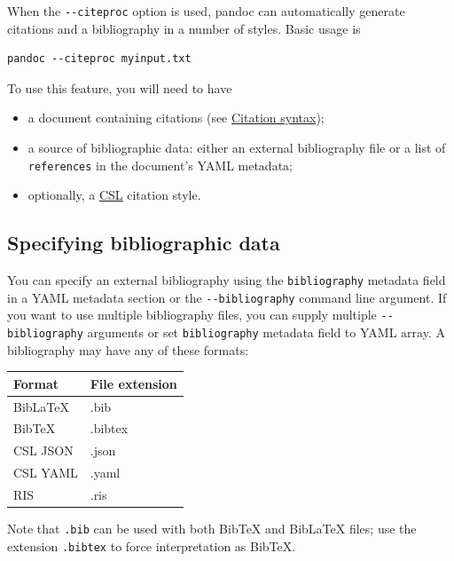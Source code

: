 \documentclass[
]{article}
\providecommand{\tightlist}{%
  \setlength{\itemsep}{0pt}\setlength{\parskip}{0pt}}
\begin{document}
When the \texttt{-\/-citeproc} option is used, pandoc can automatically
generate citations and a bibliography in a number of styles. Basic usage
is

\begin{verbatim}
pandoc --citeproc myinput.txt
\end{verbatim}

To use this feature, you will need to have

\begin{itemize}
\tightlist
\item
  a document containing citations (see
  \protect\hyperlink{citation-syntax}{Citation syntax});
\item
  a source of bibliographic data: either an external bibliography file
  or a list of \texttt{references} in the document's YAML metadata;
\item
  optionally, a
  \href{https://docs.citationstyles.org/en/stable/specification.html}{CSL}
  citation style.
\end{itemize}

\hypertarget{specifying-bibliographic-data}{%
\subsection{Specifying bibliographic
data}\label{specifying-bibliographic-data}}

You can specify an external bibliography using the \texttt{bibliography}
metadata field in a YAML metadata section or the
\texttt{-\/-bibliography} command line argument. If you want to use
multiple bibliography files, you can supply multiple
\texttt{-\/-bibliography} arguments or set \texttt{bibliography}
metadata field to YAML array. A bibliography may have any of these
formats:

\begin{longtable}[]{@{}ll@{}}
\toprule\noalign{}
Format & File extension \\
\midrule\noalign{}
\endhead
\bottomrule\noalign{}
\endlastfoot
BibLaTeX & .bib \\
BibTeX & .bibtex \\
CSL JSON & .json \\
CSL YAML & .yaml \\
RIS & .ris \\
\end{longtable}

Note that \texttt{.bib} can be used with both BibTeX and BibLaTeX files;
use the extension \texttt{.bibtex} to force interpretation as BibTeX.
\end{document}
